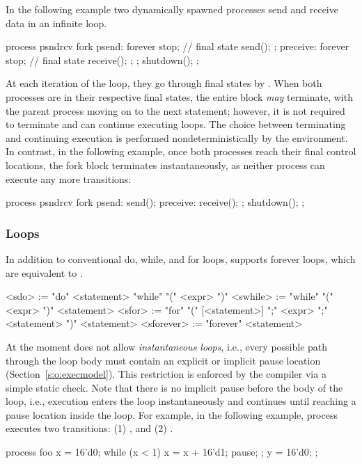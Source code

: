 In the following example two dynamically spawned processes send 
and receive data in an infinite loop.
\begin{tsllisting2}
process psndrcv {
  fork {
    psend:    forever {
                  stop;   // final state
                  send();
              };
    preceive: forever {
                  stop;   // final state
                  receive();
              };
  };
  shutdown();
};
\end{tsllisting2}
At each iteration of the loop, they go through final states by 
.  When both processes are in their respective final 
states, the entire  block \emph{may} terminate, with the 
parent process moving on to the next statement; however, it is not 
required to terminate and can continue executing  
loops.  The choice between terminating and continuing execution is 
performed nondeterministically by the environment.  In contrast, 
in the following example, once both processes reach their final 
control locations, the fork block terminates instantaneously, as 
neither process can execute any more transitions:
\begin{tsllisting2}
process psndrcv {
  fork {
    psend:    send();
    preceive: receive();
  };
  shutdown();
};
\end{tsllisting2}

\subsubsection{Loops}\label{sec:loops}

In addition to conventional do, while, and for loops, \tsl 
supports forever loops, which are equivalent to .
\begin{bnflisting}
<sdo>      := "do" <statement> "while" "(" <expr> ")"
<swhile>   := "while" "(" <expr> ")" <statement>
<sfor>     := "for" "(" [<statement>] ";" 
                        <expr> ";" 
                        <statement> ")" 
                  <statement>
<sforever> := "forever" <statement>
\end{bnflisting}

At the moment \tsl does not allow \emph{instantaneous loops}, 
i.e., every possible path through the loop body must contain an 
explicit or implicit pause location (Section~\ref{s:o:execmodel}).  
This restriction is enforced by the compiler via a simple static 
check.  Note that there is no implicit pause before the body of the 
loop, i.e., execution enters the loop instantaneously and 
continues until reaching a pause location inside the loop.  For 
example, in the following example, process  executes two 
transitions: (1) , and 
(2) .
\begin{tsllisting2}
process foo {
    x = 16'd0;
    while (x < 1) {
        x = x + 16'd1;
        pause;
    };
    y = 16'd0;
};
\end{tsllisting2}

